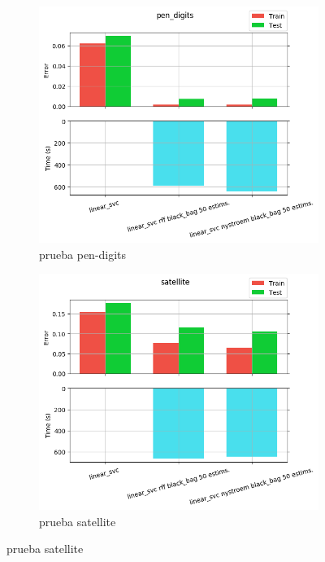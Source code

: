 \begin{figure}[ht]
  \centering
  \begin{subfigure}[b]{0.5\linewidth}
    \centering\captionsetup{width=.8\linewidth}\includegraphics[width=\imgscale\linewidth]{Figures/2_6/pen_digits}
    \caption{prueba pen-digits}
    \label{fig:2_6_pen_digits}
  \end{subfigure}%
  \begin{subfigure}[b]{0.5\linewidth}
    \centering\captionsetup{width=.8\linewidth}\includegraphics[width=\imgscale\linewidth]{Figures/2_6/satellite}
    \caption{prueba satellite}
    \label{fig:2_6_satellite}
  \end{subfigure}
\end{figure}

